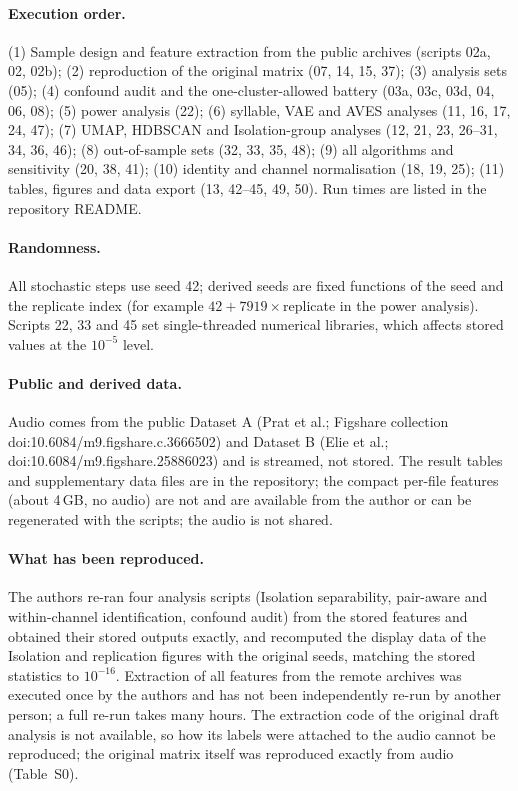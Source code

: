 \documentclass[11pt]{article}
\begin{document}
\paragraph{Execution order.} (1) Sample design and feature extraction from the public archives (scripts 02a, 02, 02b); (2) reproduction of the original matrix (07, 14, 15, 37); (3) analysis sets (05); (4) confound audit and the one-cluster-allowed battery (03a, 03c, 03d, 04, 06, 08); (5) power analysis (22); (6) syllable, VAE and AVES analyses (11, 16, 17, 24, 47); (7) UMAP, HDBSCAN and Isolation-group analyses (12, 21, 23, 26--31, 34, 36, 46); (8) out-of-sample sets (32, 33, 35, 48); (9) all algorithms and sensitivity (20, 38, 41); (10) identity and channel normalisation (18, 19, 25); (11) tables, figures and data export (13, 42--45, 49, 50). Run times are listed in the repository README.
\paragraph{Randomness.} All stochastic steps use seed 42; derived seeds are fixed functions of the seed and the replicate index (for example $42+7919\times$replicate in the power analysis). Scripts 22, 33 and 45 set single-threaded numerical libraries, which affects stored values at the $10^{-5}$ level.
\paragraph{Public and derived data.} Audio comes from the public Dataset A (Prat et al.; Figshare collection doi:10.6084/m9.figshare.c.3666502) and Dataset B (Elie et al.; doi:10.6084/m9.figshare.25886023) and is streamed, not stored. The result tables and supplementary data files are in the repository; the compact per-file features (about 4\,GB, no audio) are not and are available from the author or can be regenerated with the scripts; the audio is not shared.
\paragraph{What has been reproduced.} The authors re-ran four analysis scripts (Isolation separability, pair-aware and within-channel identification, confound audit) from the stored features and obtained their stored outputs exactly, and recomputed the display data of the Isolation and replication figures with the original seeds, matching the stored statistics to $10^{-16}$. Extraction of all features from the remote archives was executed once by the authors and has not been independently re-run by another person; a full re-run takes many hours. The extraction code of the original draft analysis is not available, so how its labels were attached to the audio cannot be reproduced; the original matrix itself was reproduced exactly from audio (Table~S0).
\end{document}
